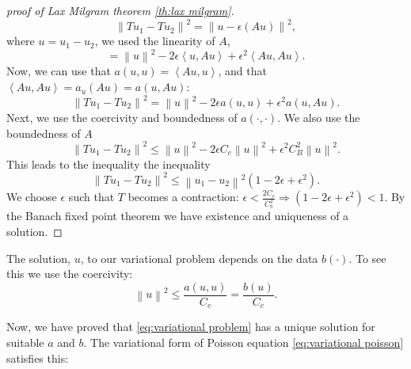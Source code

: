 \documentclass[../Main/main.tex]{subfiles}
\begin{document}
\begin{proof}[proof of Lax Milgram theorem \ref{th:lax milgram}]
\begin{equation*}
			\left \| Tu_1 - Tu_2 \right \|^2 = \left \| u-\epsilon(Au) \right \|^2,
		\end{equation*}
		where $u = u_1 - u_2$, we used the linearity of $A$,
		\begin{equation*}
			=\left \| u \right \|^2 - 2 \epsilon \left \langle u,Au \right \rangle + \epsilon^2 \left \langle Au,Au \right\rangle.
		\end{equation*}
		Now, we can use that $a(u,u)=\left \langle Au,u \right \rangle$, and that $\left \langle Au,Au \right \rangle = a_u(Au) = a(u,Au)$: 
		\begin{equation*}
		\left \| Tu_1 - Tu_2 \right \|^2 =\left \| u \right \|^2 - 2\epsilon a(u,u) + \epsilon^2 a(u,Au).
		\end{equation*}
		Next, we use the coercivity and boundedness of $a(\cdot,\cdot)$. We also use the boundedness of $A$
		\begin{equation*}
			\left \| Tu_1 - Tu_2 \right \|^2\leq \left \|u  \right \|^2 -2\epsilon C_c \left \| u \right \|^2 + \epsilon^2 C_B^2 \left \|u  \right \|^2.
		\end{equation*}
		This leads to the inequality the inequality
		\begin{equation*}
			\left \| Tu_1 -Tu_2 \right \|^2 \leq \left \| u_1 - u_2 \right \|^2 (1-2\epsilon + \epsilon^2).
		\end{equation*}
		We choose $\epsilon$ such that $T$ becomes a contraction:
		$\epsilon < \frac{2 C_c}{C_b^2} \Rightarrow (1-2\epsilon + \epsilon^2)<1$. By the Banach fixed point theorem we have existence and uniqueness of a solution.
	\end{proof}
	\begin{remark}\label{rm:stability}
		The solution, $u$, to our variational problem depends on the data $b(\cdot)$. To see this we use the coercivity:
		\begin{equation*}
			\left \| u \right \|^2 \leq \frac{a(u,u)}{C_c} = \frac{b(u)}{C_c}.
		\end{equation*}
	\end{remark}
	Now, we have proved that \eqref{eq:variational problem} has a unique solution for suitable $a$ and $b$. The variational form of Poisson equation \eqref{eq:variational poisson} satisfies this:
\end{document}
